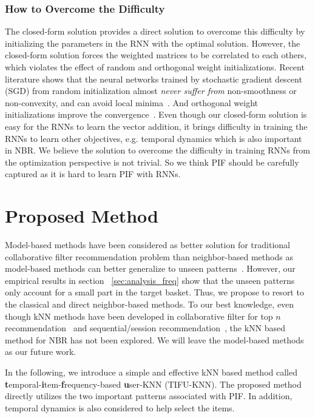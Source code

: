 \documentclass[sigconf]{acmart}
\begin{document}
\subsubsection{How to Overcome the Difficulty}
The closed-form solution provides a direct solution to overcome this difficulty by initializing the parameters in the RNN with the optimal solution. However, the closed-form solution forces the  weighted matrices to be  correlated to each others,  which violates the effect of random and orthogonal weight initializations.  Recent literature shows that the neural networks trained by stochastic gradient descent (SGD) from random  initialization almost \textit{never suffer from} non-smoothness or non-convexity, and can avoid local  minima~\cite{goodfellow2014qualitatively}. And  orthogonal weight initializations improve the  convergence~\cite{hu2020provable}. Even though our closed-form solution is easy for the RNNs to learn  the vector addition, it brings  difficulty in training the RNNs to learn other objectives, e.g.  temporal dynamics which is also important in NBR.  We believe the solution to overcome the difficulty in training RNNs from the  optimization perspective is not trivial. So we think  PIF should be  carefully captured as it is hard to learn PIF with RNNs.  

\section{Proposed Method}
\label{sec:method}

Model-based methods have  been considered as better solution for traditional collaborative filter recommendation problem than neighbor-based methods as model-based methods can better  generalize to unseen patterns~\cite{ning2015comprehensive}. However, our empirical  results in section  ~\ref{sec:analysis_freq} show that the unseen patterns only account for a small part in the target basket. Thus, we propose to resort to the classical and direct neighbor-based methods. To  our best knowledge, even  though kNN methods have  been developed in  collaborative filter for top  $n$ recommendation~\cite{konstan1997grouplens}\cite{deshpande2004item}
 and  sequential/session  recommendation~\cite{jannach2017recurrent}, the kNN  based method for NBR has not been explored. We will leave the model-based methods as our future work.

In the following,  we introduce a simple and effective kNN based  method called  \textbf{t}emporal-\textbf{i}tem-\textbf{f}requency-based  \textbf{u}ser-KNN (TIFU-KNN).  The proposed method directly utilizes  the two important  patterns associated with PIF.  In addition, temporal dynamics is also considered to help select the items. 
\end{document}
